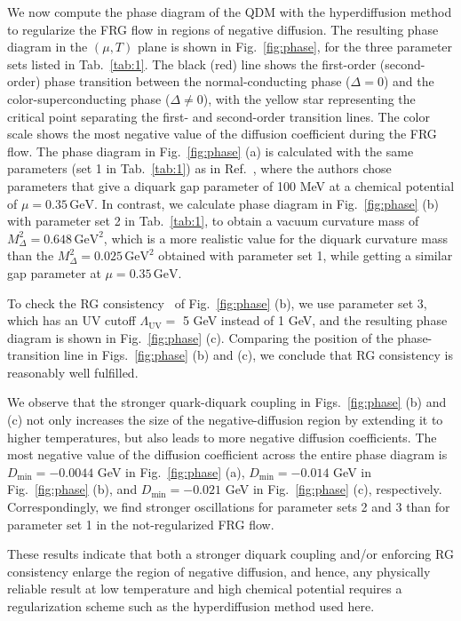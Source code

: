 \documentclass[
onecolumn,
aps,
prd,
amsmath,
amssymb,
nofootinbib
]{revtex4-2}
\begin{document}
We now compute the phase diagram of the QDM with the hyperdiffusion method to regularize the FRG flow in regions of negative diffusion.
The resulting phase diagram in the $(\mu, T)$ plane is shown in Fig.~\ref{fig:phase}, for the three parameter sets listed in Tab.~\ref{tab:1}.
The black (red) line shows the first-order (second-order) phase transition between the normal-conducting phase ($\Delta =0$) and the color-superconducting phase ($\Delta \neq 0$), with the yellow star representing the critical point separating the first- and second-order transition lines. 
The color scale shows the most negative value of the diffusion coefficient during the FRG flow.
The phase diagram in Fig.~\ref{fig:phase} (a) is calculated with the same parameters (set 1 in Tab.~\ref{tab:1}) as in Ref.~\cite{stoll2025nonperturbative}, where the authors chose parameters that give a diquark gap parameter of 100 MeV at a chemical potential of $\mu = 0.35\,\text{GeV}$. 
In contrast, we calculate phase diagram in Fig.~\ref{fig:phase} (b) with parameter set 2 in Tab.~\ref{tab:1}, to obtain a vacuum curvature mass of $M_\Delta^2 = 0.648 \,\mathrm{GeV}^2$, which is a more realistic value for the diquark curvature mass than the $M_\Delta^2 = 0.025\,\mathrm{GeV}^2$ obtained with parameter set 1, while getting a similar gap parameter at $\mu = 0.35\,\text{GeV}$.

To check the RG consistency~\cite{Braun:2018svj} of Fig.~\ref{fig:phase} (b), we use parameter set 3, which has an UV cutoff $\Lambda_{\text{UV}} =$ 5 GeV instead of 1 GeV, and the resulting phase diagram is shown in Fig.~\ref{fig:phase} (c).
Comparing the position of the phase-transition line in Figs.~\ref{fig:phase} (b) and (c), we conclude that RG consistency is reasonably well fulfilled. 

We observe that the stronger quark-diquark coupling in Figs.~\ref{fig:phase} (b) and (c) not only increases the size of the negative-diffusion region by extending it to higher temperatures, but also leads to more negative diffusion coefficients.
The most negative value of the diffusion coefficient across the entire phase diagram
is $D_{\mathrm{min}} =-0.0044$ GeV in Fig.~\ref{fig:phase} (a), $D_{\mathrm{min}} =-0.014$ GeV in Fig.~\ref{fig:phase} (b), and $D_{\mathrm{min}} = -0.021$ GeV in Fig.~\ref{fig:phase} (c), respectively. Correspondingly, we find stronger oscillations for parameter sets 2 and 3 than for parameter set 1 in the not-regularized FRG flow. 

These results indicate that both a stronger diquark coupling and/or enforcing RG consistency enlarge the region of negative diffusion, and hence, any physically reliable result at low temperature and high chemical potential requires a regularization scheme such as the hyperdiffusion method used here.
\end{document}
